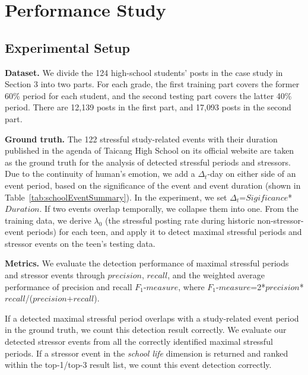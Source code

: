\section{Performance Study}

\subsection{Experimental Setup}

\textbf{Dataset.}
We divide the 124 high-school students' posts in the case study in Section 3 into two parts.
For each grade, the first training part covers the former 60\% period for each student,
and the second testing part covers the latter 40\% period.
There are 12,139 posts in the first part, and 17,093 posts in the second part.

\textbf{Ground truth.}
The 122 stressful study-related events with their duration published in the agenda of Taicang High School on its official website
are taken as the ground truth for the analysis of detected stressful periods and stressors.
Due to the continuity of human's emotion, we add a $\Delta_t$-day on either side of an event period,
based on the significance of the event and event duration (shown in Table~\ref{tab:schoolEventSummary}).
In the experiment, we set $\Delta_t$=$Sigificance$*$Duration$.
If two events overlap temporally, we collapse them into one.
From the training data, we derive $\lambda_0$
(the stressful posting rate during historic non-stressor-event periods) for each teen, and apply it
to detect maximal stressful periods and stressor events on the teen's testing data.

\textbf{Metrics.}
We evaluate the detection performance of maximal stressful periods and stressor events
through $precision$, $recall$, and the weighted average performance of precision and recall
$F_1$-$measure$, where $F_1$-$measure$=2*$precision$*$recall$/($precision$+$recall$).

If a detected maximal stressful period overlaps with a study-related event period in the ground truth,
we count this detection result correctly.
We evaluate our detected stressor events from all the correctly identified maximal stressful periods.
If a stressor event in the \emph{school life} dimension is returned and ranked within the top-1/top-3 result list,
we count this event detection correctly.


